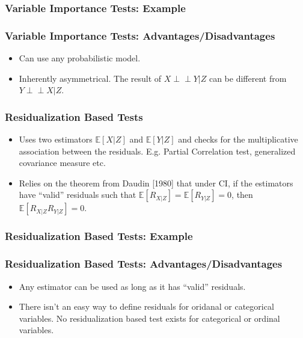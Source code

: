 \documentclass{beamer}
\def\ci{\perp\!\!\!\!\!\perp}
\begin{document}
\begin{frame}
	\frametitle{Variable Importance Tests: Example}
\end{frame}

\begin{frame}
	\frametitle{Variable Importance Tests: Advantages/Disadvantages}
	\begin{itemize}
		\item Can use any probabilistic model.
		\item Inherently asymmetrical. The result of $ X \ci Y | Z $
			can be different from $ Y \ci X | Z $.
	\end{itemize}

\end{frame}

\begin{frame}
	\frametitle{Residualization Based Tests}
	\begin{itemize}
		\setlength\itemsep{1em}
		\item Uses two estimators $ \mathbb{E}[X| Z] $ and $
			\mathbb{E}[Y | Z] $ and checks for the multiplicative
			association between the residuals. E.g.
			Partial Correlation test, generalized covariance measure etc.
		\item Relies on the theorem from Daudin [1980] \footnotemark 
			that under CI, if the estimators have ``valid'' residuals
			such that $ \mathbb{E}[R_{X|Z}] = \mathbb{E}[R_{Y|Z}] = 0 $,
			then $ \mathbb{E}[R_{X|Z} R_{Y|Z}] = 0 $.
	\end{itemize}
\end{frame}

\begin{frame}
	\frametitle{Residualization Based Tests: Example}
\end{frame}

\begin{frame}
	\frametitle{Residualization Based Tests: Advantages/Disadvantages}
	\begin{itemize}
		\item Any estimator can be used as long as it has ``valid'' residuals.
		\item There isn't an easy way to define residuals for oridanal or categorical variables. No residualization based test exists for categorical or ordinal variables.
	\end{itemize}
\end{frame}
\end{document}
